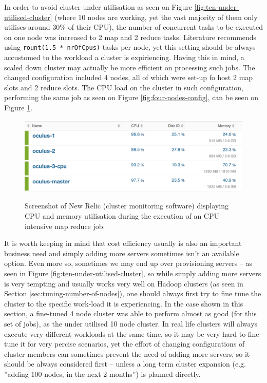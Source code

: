 In order to avoid cluster under utilisation as seen on Figure \ref{fig:ten-under-utilised-cluster} (where 10 nodes are working, yet the vast majority of them only utilises around 30\% of their CPU), the number of concurrent tasks to be executed on one node was increased to 2 map and 2 reduce tasks. Literature recommends using \verb|rount(1.5 * nrOfCpus)| tasks per node, yet this setting should be always accustomed to the workload a cluster is expiriencing. Having this in mind, a scaled down cluster may actually be more efficient on processing such jobs. The changed configuration included 4 nodes, all of which were set-up fo host 2 map slots and 2 reduce slots. The CPU load on the cluster in such configuration, performing the same job as seen on Figure \ref{fig:four-nodes-config}, can be seen on Figure \ref{fig:cpu-load-during-job}.

\begin{figure}[ch!]
  \centering
  \includegraphics[width=\textwidth]{img/hadoop/monitoring-during-processing}
  \label{fig:cpu-load-during-job}
  \caption{Screenshot of New Relic (cluster monitoring software) displaying CPU and memory utilisation during the execution of an CPU intensive map reduce job.}
\end{figure}

It is worth keeping in mind that cost efficiency usually is also an important business need and simply adding more servers sometimes isn't an available option. Even more so, sometimes we may end up over provisioning servers -- as seen in Figure \ref{fig:ten-under-utilised-cluster}, so while simply adding more servers is very tempting and usually works very well on Hadoop clusters (as seen in Section \ref{sec:tuning-number-of-nodes}), one should always first try to fine tune the cluster to the specific work-load it is experiencing. In the case shown in this section, a fine-tuned 4 node cluster was able to perform almost as good (for this set of jobs), as the under utilised 10 node cluster. In real life clusters will always execute very different workloads at the same time, so it may be very hard to fine tune it for very percise scenarios, yet the effort of changing configurations of cluster members can sometimes prevent the need of adding more servers, so it should be always considered first -- unless a long term cluster expansion (e.g. ''adding 100 nodes, in the next 2 months'') is planned directly.



